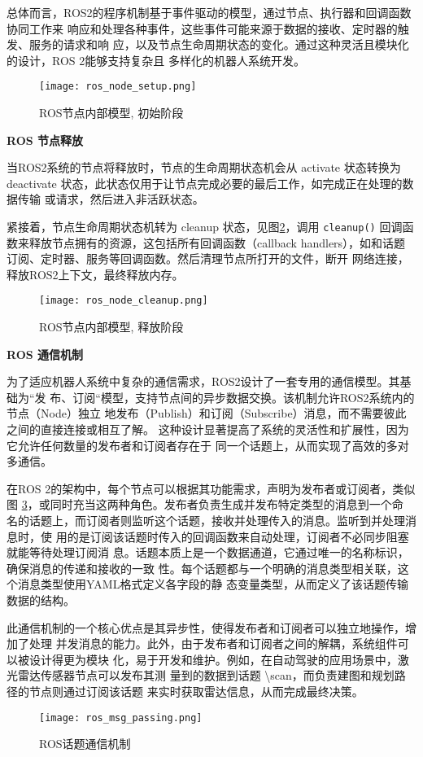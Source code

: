 总体而言，ROS2的程序机制基于事件驱动的模型，通过节点、执行器和回调函数协同工作来
响应和处理各种事件，这些事件可能来源于数据的接收、定时器的触发、服务的请求和响
应，以及节点生命周期状态的变化。通过这种灵活且模块化的设计，ROS 2能够支持复杂且
多样化的机器人系统开发。


\begin{figure}[h]
    \centering
    \texttt{[image: ros\_node\_setup.png]}
    \caption{ROS节点内部模型, 初始阶段}
    \label{pic:rns}
\end{figure}

\textbf{ROS 节点释放}

当ROS2系统的节点将释放时，节点的生命周期状态机会从 activate 状态转换为
deactivate 状态，此状态仅用于让节点完成必要的最后工作，如完成正在处理的数据传输
或请求，然后进入非活跃状态。

紧接着，节点生命周期状态机转为 cleanup 状态，见图\ref{pic:rnc}，调用
\texttt{cleanup()} 回调函数来释放节点拥有的资源，这包括所有回调函数（callback
handlers），如和话题订阅、定时器、服务等回调函数。然后清理节点所打开的文件，断开
网络连接，释放ROS2上下文，最终释放内存。

\begin{figure}[h]
    \centering
    \texttt{[image: ros\_node\_cleanup.png]}
    \caption{ROS节点内部模型, 释放阶段}
    \label{pic:rnc}
\end{figure}

\textbf{ROS 通信机制}

为了适应机器人系统中复杂的通信需求，ROS2设计了一套专用的通信模型。其基础为“发
布、订阅“模型，支持节点间的异步数据交换。该机制允许ROS2系统内的节点（Node）独立
地发布（Publish）和订阅（Subscribe）消息，而不需要彼此之间的直接连接或相互了解。
这种设计显著提高了系统的灵活性和扩展性，因为它允许任何数量的发布者和订阅者存在于
同一个话题上，从而实现了高效的多对多通信。

在ROS 2的架构中，每个节点可以根据其功能需求，声明为发布者或订阅者，类似图
\ref{pic:rmp}，或同时充当这两种角色。发布者负责生成并发布特定类型的消息到一个命
名的话题上，而订阅者则监听这个话题，接收并处理传入的消息。监听到并处理消息时，使
用的是订阅该话题时传入的回调函数来自动处理，订阅者不必同步阻塞就能等待处理订阅消
息。话题本质上是一个数据通道，它通过唯一的名称标识，确保消息的传递和接收的一致
性。每个话题都与一个明确的消息类型相关联，这个消息类型使用YAML格式定义各字段的静
态变量类型，从而定义了该话题传输数据的结构。

此通信机制的一个核心优点是其异步性，使得发布者和订阅者可以独立地操作，增加了处理
并发消息的能力。此外，由于发布者和订阅者之间的解耦，系统组件可以被设计得更为模块
化，易于开发和维护。例如，在自动驾驶的应用场景中，激光雷达传感器节点可以发布其测
量到的数据到话题 \textbackslash scan，而负责建图和规划路径的节点则通过订阅该话题
来实时获取雷达信息，从而完成最终决策。


\begin{figure}[h]
    \centering
    \texttt{[image: ros\_msg\_passing.png]}
    \caption{ROS话题通信机制}
    \label{pic:rmp}
\end{figure}